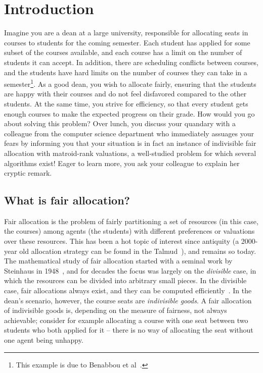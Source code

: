 \chapter{Introduction}

Imagine you are a dean at a large university, responsible for allocating seats in courses to students for the coming semester. Each student has applied for some subset of the courses available, and each course has a limit on the number of students it can accept. In addition, there are scheduling conflicts between courses, and the students have hard limits on the number of courses they can take in a semester\footnote{This example is due to Benabbou et al~\cite{Benabbou_2020}.}. As a good dean, you wish to allocate fairly, ensuring that the students are happy with their courses and do not feel disfavored compared to the other students. At the same time, you strive for efficiency, so that every student gets enough courses to make the expected progress on their grade. How would you go about solving this problem? Over lunch, you discuss your quandary with a colleague from the computer science department who immediately assuages your fears by informing you that your situation is in fact an instance of indivisible fair allocation with matroid-rank valuations, a well-studied problem for which several algorithms exist! Eager to learn more, you ask your colleague to explain her cryptic remark.

\section*{What is fair allocation?}
Fair allocation is the problem of fairly partitioning a set of resources (in this case, the courses) among agents (the students) with different preferences or valuations over these resources. This has been a hot topic of interest since antiquity (a 2000-year old allocation strategy can be found in the Talmud~\cite{aumann-1985}), and remains so today. The mathematical study of fair allocation started with a seminal work by Steinhaus in 1948~\cite{steinhaus-1948}, and for decades the focus was largely on the \textit{divisible} case, in which the resources can be divided into arbitrary small pieces. In the divisible case, fair allocations always exist, and they can be computed efficiently~\cite{amanatidis2022fair}. In the dean's scenario, however, the course seats are \textit{indivisible goods}. A fair allocation of indivisible goods is, depending on the measure of fairness, not always achievable; consider for example allocating a course with one seat between two students who both applied for it -- there is no way of allocating the seat without one agent being unhappy.

